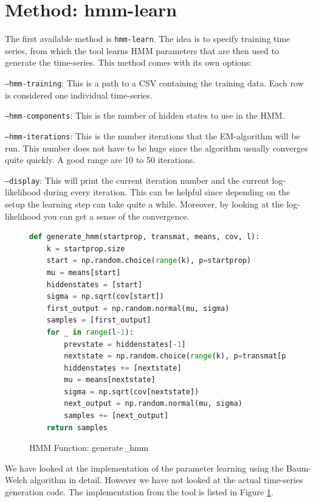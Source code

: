 \section{Method: hmm-learn}

The first available method is \texttt{hmm-learn}. The idea is to specify training time series, from which the tool learns HMM parameters that are then used to generate the time-series. This method comes with its own options:

\texttt{---hmm-training}: This is a path to a CSV containing the training data. Each row is considered one individual time-series. 

\texttt{---hmm-components}: This is the number of hidden states to use in the HMM. 

\texttt{---hmm-iterations}: This is the number iterations that the EM-algorithm will be run. This number does not have to be huge since the algorithm usually converges quite quickly. A good range are 10 to 50 iterations.

\texttt{---display}: This will print the current iteration number and the current log-likelihood during every iteration. This can be helpful since depending on the setup the learning step can take quite a while. Moreover, by looking at the log-likelihood you can get a sense of the convergence. 

\begin{figure}
\begin{singlespace}
\begin{lstlisting}[language=Python]
def generate_hmm(startprop, transmat, means, cov, l):
    k = startprop.size
    start = np.random.choice(range(k), p=startprop)
    mu = means[start]
    hiddenstates = [start]
    sigma = np.sqrt(cov[start])
    first_output = np.random.normal(mu, sigma)
    samples = [first_output]
    for _ in range(l-1):
        prevstate = hiddenstates[-1]
        nextstate = np.random.choice(range(k), p=transmat[prevstate])
        hiddenstates += [nextstate]
        mu = means[nextstate]
        sigma = np.sqrt(cov[nextstate])
        next_output = np.random.normal(mu, sigma)
        samples += [next_output]
    return samples
\end{lstlisting}
\end{singlespace}
\caption{HMM Function: generate\_hmm}    
\label{fig:hmm-generate}
\end{figure}

We have looked at the implementation of the parameter learning using the Baum-Welch algorithm in detail. However we have not looked at the actual time-series generation code. The implementation from the tool is listed in Figure \ref{fig:hmm-generate}. 

